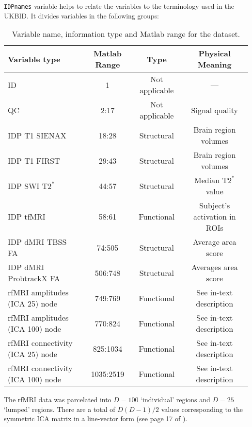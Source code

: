 \documentclass{article}
\begin{document}
{\tt IDPnames} variable helps to relate the variables to the terminology used in the UKBID. It divides variables in the following groups:
\begin{table}
  \centering
  \caption{Variable name, information type and  Matlab range for the dataset.}
  \begin{tabular}{lccc}
    \toprule
    {\bf Variable type} & {\bf Matlab Range} & {\bf Type} &{\bf Physical Meaning}\\
    \midrule
    ID  & 1 & Not applicable & --- \\
    QC  & 2:17 & Not applicable & Signal quality\\
    IDP T1 SIENAX & 18:28 & Structural & Brain region volumes\\
    IDP T1 FIRST & 29:43 & Structural & Brain region volumes\\
    IDP SWI $\text{T2}^{*}$ & 44:57 & Structural & Median $\text{T2}^{*}$ value\\
    IDP tfMRI & 58:61 & Functional & Subject's activation in ROIs\\
    IDP dMRI TBSS FA & 74:505 & Structural &  Average area score\\
    IDP dMRI ProbtrackX FA & 506:748 & Structural & Averages area score\\
    rfMRI amplitudes (ICA 25) node    & 749:769 & Functional & See in-text description\\
    rfMRI amplitudes (ICA 100) node   & 770:824 & Functional & See in-text description\\
    rfMRI connectivity (ICA 25) node  & 825:1034 & Functional & See in-text description\\
    rfMRI connectivity (ICA 100) node & 1035:2519 & Functional &  See in-text description\\
    \bottomrule
  \end{tabular}
  \label{tab:data-ranges}
\end{table}

The rfMRI data was parcelated into $D=100$ `individual' regions and $D=25$ `lumped' regions. There are a total of $D (D-1) / 2$ values corresponding to the symmetric ICA matrix in a line-vector form (see page 17 of \cite{Smith2016}).
\end{document}
